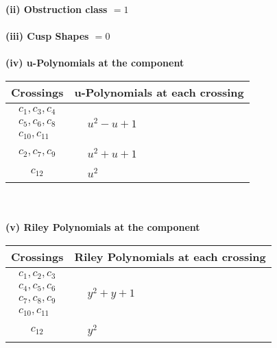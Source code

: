 \documentclass[1p]{elsarticle_modified}
\theoremstyle{definition}
\begin{document}
\flushleft \textbf{(ii) Obstruction class $= 1$}\\~\\
\flushleft \textbf{(iii) Cusp Shapes $= 0$}\\~\\
\newpage\renewcommand{\arraystretch}{1}
\flushleft \textbf{(iv) u-Polynomials at the component}\newline \\
\begin{tabular}{m{50pt}|m{274pt}}
Crossings & \hspace{64pt}u-Polynomials at each crossing \\
\hline $$\begin{aligned}c_{1},c_{3},c_{4}\\c_{5},c_{6},c_{8}\\c_{10},c_{11}\end{aligned}$$&$\begin{aligned}
&u^2- u+1
\end{aligned}$\\
\hline $$\begin{aligned}c_{2},c_{7},c_{9}\end{aligned}$$&$\begin{aligned}
&u^2+u+1
\end{aligned}$\\
\hline $$\begin{aligned}c_{12}\end{aligned}$$&$\begin{aligned}
&u^2
\end{aligned}$\\
\hline
\end{tabular}\\~\\
\newpage\renewcommand{\arraystretch}{1}
\flushleft \textbf{(v) Riley Polynomials at the component}\newline \\
\begin{tabular}{m{50pt}|m{274pt}}
Crossings & \hspace{64pt}Riley Polynomials at each crossing \\
\hline $$\begin{aligned}c_{1},c_{2},c_{3}\\c_{4},c_{5},c_{6}\\c_{7},c_{8},c_{9}\\c_{10},c_{11}\end{aligned}$$&$\begin{aligned}
&y^2+y+1
\end{aligned}$\\
\hline $$\begin{aligned}c_{12}\end{aligned}$$&$\begin{aligned}
&y^2
\end{aligned}$\\
\hline
\end{tabular}\\~\\
\end{document}
